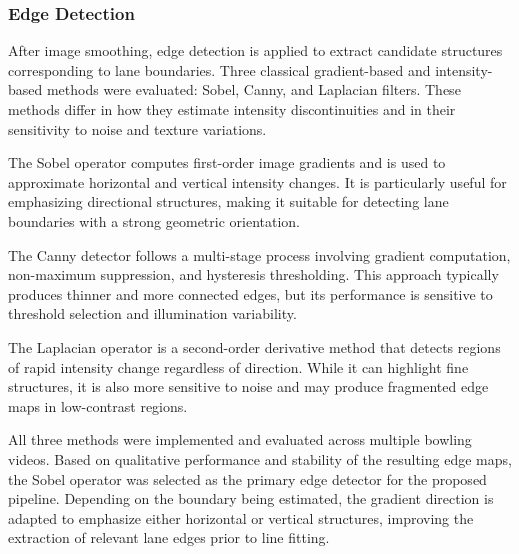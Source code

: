 \subsubsection{Edge Detection}
After image smoothing, edge detection is applied to extract candidate structures corresponding to lane boundaries. Three classical gradient-based and intensity-based methods were evaluated: Sobel, Canny, and Laplacian filters. These methods differ in how they estimate intensity discontinuities and in their sensitivity to noise and texture variations.

The Sobel operator computes first-order image gradients and is used to approximate horizontal and vertical intensity changes. It is particularly useful for emphasizing directional structures, making it suitable for detecting lane boundaries with a strong geometric orientation.

The Canny detector follows a multi-stage process involving gradient computation, non-maximum suppression, and hysteresis thresholding. This approach typically produces thinner and more connected edges, but its performance is sensitive to threshold selection and illumination variability.

The Laplacian operator is a second-order derivative method that detects regions of rapid intensity change regardless of direction. While it can highlight fine structures, it is also more sensitive to noise and may produce fragmented edge maps in low-contrast regions.

All three methods were implemented and evaluated across multiple bowling videos. Based on qualitative performance and stability of the resulting edge maps, the Sobel operator was selected as the primary edge detector for the proposed pipeline. Depending on the boundary being estimated, the gradient direction is adapted to emphasize either horizontal or vertical structures, improving the extraction of relevant lane edges prior to line fitting.

